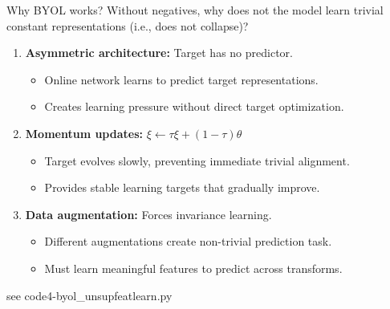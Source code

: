 \documentclass{beamer}
\begin{document}
\begin{frame}{Why BYOL works?}
Without negatives, why does not the model learn trivial constant
representations (i.e., does not collapse)?
   \vspace{0.3cm}
\begin{enumerate}
\item \textbf{Asymmetric architecture:} Target has no predictor.
\vspace{0.3cm}
   \begin{itemize}
   \item Online network learns to predict target representations.
   \item Creates learning pressure without direct target optimization.
   \end{itemize}
\vspace{0.3cm}   
\item \textbf{Momentum updates:} $\xi \leftarrow \tau \xi + (1-\tau) \theta$
  \vspace{0.3cm}
   \begin{itemize}
   \item Target evolves slowly, preventing immediate trivial alignment.
   \item Provides stable learning targets that gradually improve.
   \end{itemize}
   \vspace{0.3cm}
 \item \textbf{Data augmentation:} Forces invariance learning.
   \vspace{0.3cm}
   \begin{itemize}
   \item Different augmentations create non-trivial prediction task.
   \item Must learn meaningful features to predict across transforms.
   \end{itemize}
\end{enumerate}
   \vspace{0.3cm}
see code4-byol\_unsupfeatlearn.py 
\end{frame}
\end{document}

